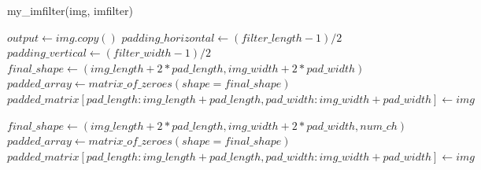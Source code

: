 \documentclass{bmvc2k}
\begin{document}
\begin{algorithm}[H]
	\caption {my\_imfilter(img, imfilter)}
   \begin{algorithmic}[1]

      
        \State $ output \gets img.copy() $
        \State $ padding\_horizontal \gets (filter\_length -1 )/2 $
      \State $ padding\_vertical \gets (filter\_width -1)/2 $
      \State $ final\_shape \gets (img\_length + 2*pad\_length, img\_width + 2*pad\_width)$
      \State $  padded\_array \gets matrix\_of\_zeroes(shape=final\_shape)  $
      \State $  padded\_matrix[pad\_length : img\_length + pad\_length, pad\_width : img\_width + pad\_width] \gets img  $
      
          \EndFor
        \EndFor
      

      \Else

      \State $ final\_shape \gets (img\_length + 2*pad\_length, img\_width + 2*pad\_width, num\_ch)$
      \State $  padded\_array \gets matrix\_of\_zeroes(shape=final\_shape)  $
      \State $  padded\_matrix[pad\_length : img\_length + pad\_length, pad\_width : img\_width + pad\_width] \gets img  $
          \EndFor
        \EndFor
      \EndFor
        \EndIf

      \Else 
    
      
      \EndIf

    
    

  \end{algorithmic}
  

\end{algorithm}
\end{document}
